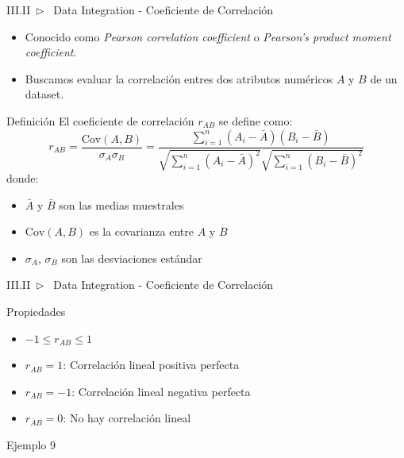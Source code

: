 \documentclass[xcolor=dvipsnames]{beamer}
\begin{document}
    \begin{frame}{III.II~$\rhd$~ Data Integration - Coeficiente de Correlación}
        \begin{itemize}
            \item Conocido como \textit{Pearson correlation coefficient} o \textit{Pearson's product moment coefficient}.
            \item Buscamos evaluar la correlación entres dos atributos numéricos $A$ y $B$ de un dataset.
        \end{itemize}
        \begin{block}{Definición}
            El coeficiente de correlación $r_{AB}$ se define como:
            \[
            r_{AB} = \frac{\text{Cov}(A,B)}{\sigma_A \sigma_B} = \frac{\sum_{i=1}^n (A_i - \bar{A})(B_i - \bar{B})}{\sqrt{\sum_{i=1}^n (A_i - \bar{A})^2} \sqrt{\sum_{i=1}^n (B_i - \bar{B})^2}}
            \]
            donde:
            \begin{itemize}
            \item $\bar{A}$ y $\bar{B}$ son las medias muestrales
            \item $\text{Cov}(A,B)$ es la covarianza entre $A$ y $B$
            \item $\sigma_A$, $\sigma_B$ son las desviaciones estándar
            \end{itemize}
        \end{block}
    \end{frame}

    \begin{frame}{III.II~$\rhd$~ Data Integration - Coeficiente de Correlación}
        \begin{alertblock}{Propiedades}
            \begin{itemize}
            \item $-1 \leq r_{AB} \leq 1$
            \item $r_{AB} = 1$: Correlación lineal positiva perfecta
            \item $r_{AB} = -1$: Correlación lineal negativa perfecta
            \item $r_{AB} = 0$: No hay correlación lineal
            \end{itemize}
        \end{alertblock}
        \vspace{5mm}
        \begin{exampleblock}{Ejemplo 9}
            
        \end{exampleblock}
    \end{frame}
\end{document}
